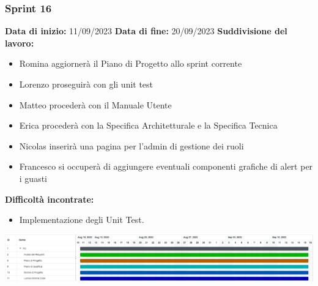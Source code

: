 \documentclass[a4paper, 12pt]{article}
\begin{document}
\subsubsection{Sprint 16}
\textbf{Data di inizio:} 11/09/2023\newline
\textbf{Data di fine:} 20/09/2023\newline
\newline
\textbf{Suddivisione del lavoro:}
\begin{itemize}
	\item Romina aggiornerà il Piano di Progetto allo sprint corrente
	\item Lorenzo proseguirà con gli unit test
	\item Matteo procederà con il Manuale Utente
	\item Erica procederà con la Specifica Architetturale e la Specifica Tecnica
	\item Nicolas inserirà una pagina per l’admin di gestione dei ruoli
	\item Francesco si occuperà di aggiungere eventuali componenti grafiche di alert per i guasti
\end{itemize}
\textbf{Difficoltà incontrate:}
\begin{itemize}
	\item Implementazione degli Unit Test.
\end{itemize}
\includegraphics[scale=0.178]{PB_4.png}\newline
\newline
\end{document}
